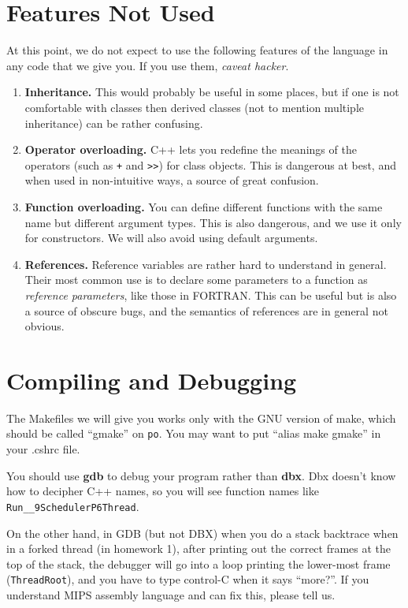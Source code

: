 \section{Features Not Used}

At this point, we do not expect to use the following features of the
language in any code that we give you.  If you use them, {\it caveat
hacker}.
\begin{enumerate}
\item {\bf Inheritance.}  This would probably be useful in some
places, but if one is not comfortable with classes then derived classes
(not to mention multiple inheritance) can be rather confusing.
\item {\bf Operator overloading.}  C++ lets you redefine the meanings
of the operators (such as {\tt +} and \verb+>>+) for class objects.
This is dangerous at best, and when used in non-intuitive ways, a
source of great confusion.
\item {\bf Function overloading.}  You can define different functions
with the same name but different argument types.  This is also
dangerous, and we use it only for constructors.  We will also avoid
using default arguments.
\item {\bf References.}  Reference variables are rather hard to
understand in general.  Their most common use is to declare some
parameters to a function as {\it reference parameters}, like those in
FORTRAN.  This can be useful but is also a source of obscure bugs, and
the semantics of references are in general not obvious.
\end{enumerate}

\section{Compiling and Debugging}

The Makefiles we will give you works only with the GNU version of
make, which should be called ``gmake'' on {\tt po}.  You may want
to put ``alias make gmake'' in your .cshrc file.

You should use {\bf gdb} to debug your program rather than {\bf dbx}.
Dbx doesn't know how to decipher C++ names, so you will see function
names like \verb+Run__9SchedulerP6Thread+.

On the other hand, in GDB (but not DBX) when you do a stack backtrace
when in a forked thread (in homework 1), after printing out the
correct frames at the top of the stack, the debugger will go into a
loop printing the lower-most frame ({\tt ThreadRoot}), and you have to
type control-C when it says ``more?''.  If you understand MIPS
assembly language and can fix this, please tell us.

